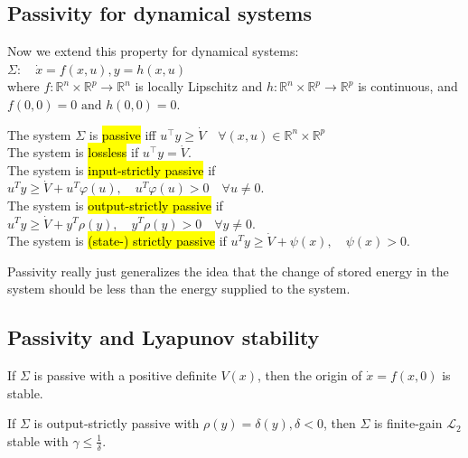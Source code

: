 \subsection{Passivity for dynamical systems}
Now we extend this property for dynamical systems: $\Sigma: \quad \dot{x}=f(x, u), y=h(x, u)$\\
where $f: \mathbb{R}^{n} \times \mathbb{R}^{p} \rightarrow \mathbb{R}^{n}$ is locally Lipschitz and $h: \mathbb{R}^{n} \times \mathbb{R}^{p} \rightarrow \mathbb{R}^{p}$ is continuous, and $f(0,0)=0 \text { and } h(0,0)=0$.

\begin{tcolorbox}[colback=white, colframe=teal]
\begin{definition}
    The system $\Sigma$ is \hl{passive} iff
    $u^{\top} y \geq \dot{V} \quad \forall(x, u) \in \mathbb{R}^{n} \times \mathbb{R}^{p}$\\
    The system is \hl{lossless} if  $u^{\top}y = \dot{V}$.\\
    The system is \hl{input-strictly passive} if $u^{T} y \geq \dot{V}+u^{T} \varphi(u), \quad u^{T} \varphi(u)>0 \quad \forall u \neq 0$.\\
    The system is \hl{output-strictly passive} if $u^{T} y \geq \dot{V}+y^{T} \rho(y), \quad y^{T} \rho(y)>0 \quad \forall y \neq 0$.\\
    The system is \hl{(state-) strictly passive} if $u^{T} y \geq \dot{V}+\psi(x), \quad \psi(x)>0$.
\end{definition}
\end{tcolorbox}

\begin{remark}
    Passivity really just generalizes the idea that the change of stored energy in the system should be less than the energy supplied to the system.
\end{remark}

\subsection{Passivity and Lyapunov stability}
\begin{lemma}
    If $\Sigma$ is passive with a positive definite $V(x)$, then the origin of $\dot{x}=f(x, 0)$ is stable.
\end{lemma}
\begin{lemma}
    If $\Sigma$ is output-strictly passive with $\rho(y) = \delta(y), \delta < 0$, then $\Sigma$ is finite-gain $\mathscr{L}_{2}$ stable with $\gamma \leq \frac{1}{\delta}$.
\end{lemma}

